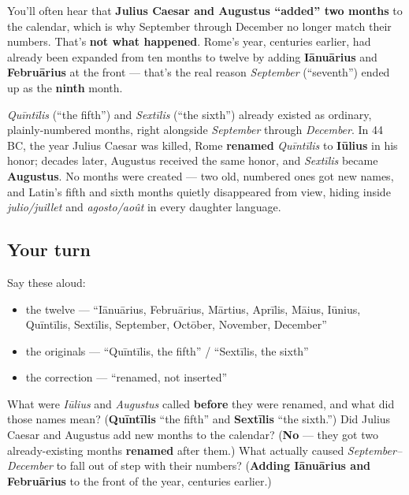 \begin{culture}
You'll often hear that \textbf{Julius Caesar and Augustus \textquotedblleft{}added\textquotedblright{} two months} to the calendar, which is why September through December no longer match their numbers. That's \textbf{not what happened}. Rome's year, centuries earlier, had already been expanded from ten months to twelve by adding \textbf{Iānuārius} and \textbf{Februārius} at the front — that's the real reason \emph{September} (\textquotedblleft{}seventh\textquotedblright{}) ended up as the \textbf{ninth} month.

\emph{Quīntīlis} (\textquotedblleft{}the fifth\textquotedblright{}) and \emph{Sextīlis} (\textquotedblleft{}the sixth\textquotedblright{}) already existed as ordinary, plainly-numbered months, right alongside \emph{September} through \emph{December}. In 44 BC, the year Julius Caesar was killed, Rome \textbf{renamed} \emph{Quīntīlis} to \textbf{Iūlius} in his honor; decades later, Augustus received the same honor, and \emph{Sextīlis} became \textbf{Augustus}. No months were created — two old, numbered ones got new names, and Latin's fifth and sixth months quietly disappeared from view, hiding inside \emph{julio/juillet} and \emph{agosto/août} in every daughter language.
\end{culture}

\subsection*{Your turn}
Say these aloud:

\begin{itemize}
\raggedright
  \item the twelve — \textquotedblleft{}Iānuārius, Februārius, Mārtius, Aprīlis, Māius, Iūnius, Quīntīlis, Sextīlis, September, Octōber, November, December\textquotedblright{}
  \item the originals — \textquotedblleft{}Quīntīlis, the fifth\textquotedblright{} / \textquotedblleft{}Sextīlis, the sixth\textquotedblright{}
  \item the correction — \textquotedblleft{}renamed, not inserted\textquotedblright{}
\end{itemize}

\begin{tcolorbox}[breakable,colback=teal!4,colframe=teal!35!black,title={Before you move on}]
What were \emph{Iūlius} and \emph{Augustus} called \textbf{before} they were renamed, and what did those names mean? (\textbf{Quīntīlis} \textquotedblleft{}the fifth\textquotedblright{} and \textbf{Sextīlis} \textquotedblleft{}the sixth.\textquotedblright{}) Did Julius Caesar and Augustus add new months to the calendar? (\textbf{No} — they got two already-existing months \textbf{renamed} after them.) What actually caused \emph{September–December} to fall out of step with their numbers? (\textbf{Adding Iānuārius and Februārius} to the front of the year, centuries earlier.)
\end{tcolorbox}
